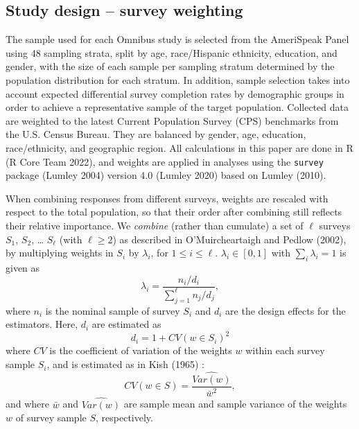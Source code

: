 \documentclass[
]{jds}
\begin{document}
\hypertarget{study-design-survey-weighting}{%
\subsection{Study design -- survey
weighting}\label{study-design-survey-weighting}}

The sample used for each Omnibus study is selected from the AmeriSpeak
Panel using 48 sampling strata, split by age, race/Hispanic ethnicity,
education, and gender, with the size of each sample per sampling stratum
determined by the population distribution for each stratum. In addition,
sample selection takes into account expected differential survey
completion rates by demographic groups in order to achieve a
representative sample of the target population. Collected data are
weighted to the latest Current Population Survey (CPS) benchmarks from
the U.S. Census Bureau. They are balanced by gender, age, education,
race/ethnicity, and geographic region. All calculations in this paper
are done in R (R Core Team 2022), and weights are applied in analyses
using the \texttt{survey} package (Lumley 2004) version 4.0 (Lumley
2020) based on Lumley (2010).

When combining responses from different surveys, weights are rescaled
with respect to the total population, so that their order after
combining still reflects their relative importance. We \emph{combine}
(rather than cumulate) a set of \(\ell\) surveys \(S_1\), \(S_2\),
\ldots{} \(S_\ell\) (with \(\ell \ge 2\)) as described in
O'Muircheartaigh and Pedlow (2002), by multiplying weights in \(S_i\) by
\(\lambda_i\), for \(1 \le i \le \ell\). \(\lambda_i \in [0,1]\) with
\(\sum_i \lambda_i = 1\) is given as \begin{equation}
\lambda_i = \frac{n_i/d_i}{\sum_{j=1}^{\ell}n_j/d_j},
\end{equation} where \(n_i\) is the nominal sample of survey \(S_i\) and
\(d_i\) are the design effects for the estimators. Here, \(d_i\) are
estimated as \begin{equation}
d_i = 1 + CV(w \in S_i)^2
\end{equation} where \(CV\) is the coefficient of variation of the
weights \(w\) within each survey sample \(S_i\), and is estimated as in
Kish (1965) : \begin{equation}
CV(w \in S) = \frac{\widehat{Var(w)}}{\bar{w}^2},
\end{equation} and where \(\bar{w}\) and \(\widehat{Var(w)}\) are sample
mean and sample variance of the weights \(w\) of survey sample \(S\),
respectively.
\end{document}

